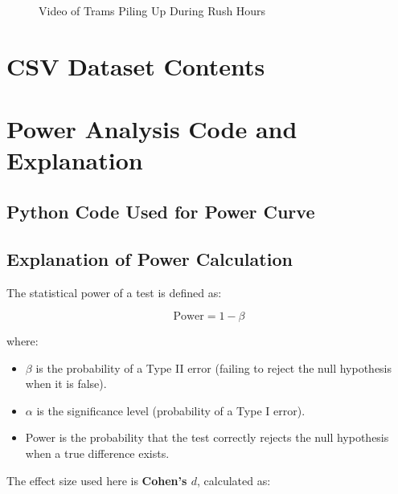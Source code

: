 \documentclass[a4paper, 10pt]{article}
\begin{document}
			\begin{figure}[h!]
				\centering
				\href{https://github.com/EmreArapcicUevak/StatisticalModelingProjectReport}{}
				\caption{Video of Trams Piling Up During Rush Hours}
				\label{fig:video_of_trams_piling_up}
			\end{figure}
	\newpage
	\begin{appendices}
		\section{CSV Dataset Contents}
		\label{sec:rawdata}
		

		\newpage
		\section{Power Analysis Code and Explanation}
		\label{sec:power_analysis}

		\subsection*{Python Code Used for Power Curve}
				

			\subsection*{Explanation of Power Calculation}

				The statistical power of a test is defined as:

				\[
				\text{Power} = 1 - \beta
				\]

				where:
				\begin{itemize}
						\item \( \beta \) is the probability of a Type II error (failing to reject the null hypothesis when it is false).
						\item \( \alpha \) is the significance level (probability of a Type I error).
						\item Power is the probability that the test correctly rejects the null hypothesis when a true difference exists.
				\end{itemize}

				The effect size used here is \textbf{Cohen's \( d \)}, calculated as:


\end{appendices}
\end{document}
